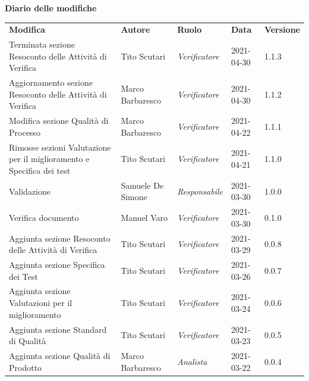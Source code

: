 \documentclass[a4paper]{article}
\begin{document}
\begin{center}
    \textbf{\Large Diario delle modifiche}\\
    \vspace{10px}
    \begin{table}[h!]
        \centering
        \renewcommand{\arraystretch}{1.8}
        \begin{tabular}{p{150px} p{90px} p{60px} p{60px} p{45px}}
            \rowcolor{logo!70} \textbf{Modifica}                  & \textbf{Autore}   & \textbf{Ruolo}        & \textbf{Data} & \textbf{Versione} \\
            Terminata sezione Resoconto delle Attività di Verifica & Tito Scutari & \textit{Verificatore} & 2021-04-30               & 1.1.3 \\
            Aggiornamento sezione Resoconto delle Attività di Verifica & Marco Barbaresco & \textit{Verificatore}       & 2021-04-30        & 1.1.2  \\                 
            Modifica sezione Qualità di Processo                  & Marco Barbaresco  & \textit{Verificatore}           & 2021-04-22        & 1.1.1  \\
            Rimosse sezioni Valutazione per il miglioramento e Specifica dei test & Tito Scutari & \textit{Verificatore} & 2021-04-21       & 1.1.0 \\
            Validazione                                           & Samuele De Simone & \textit{Responsabile} & 2021-03-30    & 1.0.0             \\
            Verifica documento                                    & Manuel Varo       & \textit{Verificatore} & 2021-03-30    & 0.1.0             \\
            Aggiunta sezione Resoconto delle Attività di Verifica & Tito Scutari      & \textit{Verificatore} & 2021-03-29    & 0.0.8             \\
            Aggiunta sezione Specifica dei Test                   & Tito Scutari      & \textit{Verificatore} & 2021-03-26    & 0.0.7             \\
            Aggiunta sezione Valutazioni per il miglioramento     & Tito Scutari      & \textit{Verificatore} & 2021-03-24    & 0.0.6             \\
            Aggiunta sezione Standard di Qualità                  & Tito Scutari      & \textit{Verificatore} & 2021-03-23    & 0.0.5             \\
            Aggiunta sezione Qualità di Prodotto                  & Marco Barbaresco  & \textit{Analista}     & 2021-03-22    & 0.0.4             \\

\end{tabular}
\end{table}
\end{center}
\end{document}
